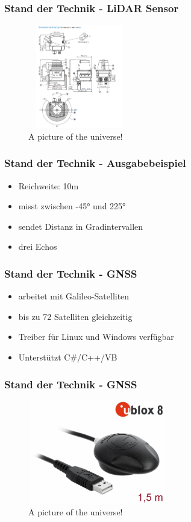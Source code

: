\documentclass{beamer}
\begin{document}
\begin{frame}
\frametitle{Stand der Technik - LiDAR Sensor}
	\begin{figure}[h!]
  		\caption{A picture of the universe!}
		\includegraphics[width = 170px, height = 170px]{LidarTim551Drawing.PNG}	
	\end{figure}
\end{frame}

\begin{frame}
\frametitle{Stand der Technik - Ausgabebeispiel}
\begin{itemize}
\item<1-> Reichweite: 10m 
\item<2-> misst zwischen -45° und 225°
\item<3-> sendet Distanz in Gradintervallen
\item<4> drei Echos
\end{itemize}
\end{frame}

\begin{frame}
\frametitle{Stand der Technik - GNSS}
\begin{itemize}
\item<1-> arbeitet mit Galileo-Satelliten
\item<2-> bis zu 72 Satelliten gleichzeitig
\item<3-> Treiber für Linux und Windows verfügbar
\item<4> Unterstützt C\#/C++/VB
\end{itemize}
\end{frame}

\begin{frame}
\frametitle{Stand der Technik - GNSS}
	\begin{figure}[h!]
  		\caption{A picture of the universe!}
		\includegraphics[width = 230px, height = 170px]{uBlox8.jpg}	
	\end{figure}
\end{frame}
\end{document}
